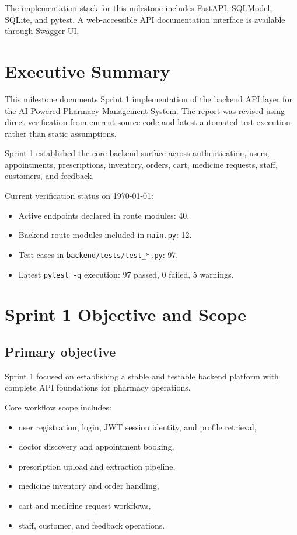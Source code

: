 \documentclass[11pt,a4paper]{article}
\newcommand{\apipath}[1]{\texttt{#1}}
\begin{document}
The implementation stack for this milestone includes FastAPI, SQLModel, SQLite, and pytest. A web-accessible API documentation interface is available through Swagger UI.

\section{Executive Summary}
This milestone documents Sprint 1 implementation of the backend API layer for the AI Powered Pharmacy Management System. The report was revised using direct verification from current source code and latest automated test execution rather than static assumptions.

Sprint 1 established the core backend surface across authentication, users, appointments, prescriptions, inventory, orders, cart, medicine requests, staff, customers, and feedback.

Current verification status on \today:
\begin{itemize}[leftmargin=1.2cm]
  \item Active endpoints declared in route modules: 40.
  \item Backend route modules included in \apipath{main.py}: 12.
  \item Test cases in \apipath{backend/tests/test_*.py}: 97.
  \item Latest \apipath{pytest -q} execution: 97 passed, 0 failed, 5 warnings.
\end{itemize}

\section{Sprint 1 Objective and Scope}
\subsection{Primary objective}
Sprint 1 focused on establishing a stable and testable backend platform with complete API foundations for pharmacy operations.

Core workflow scope includes:
\begin{itemize}[leftmargin=1.2cm]
  \item user registration, login, JWT session identity, and profile retrieval,
  \item doctor discovery and appointment booking,
  \item prescription upload and extraction pipeline,
  \item medicine inventory and order handling,
  \item cart and medicine request workflows,
  \item staff, customer, and feedback operations.
\end{itemize}
\end{document}
